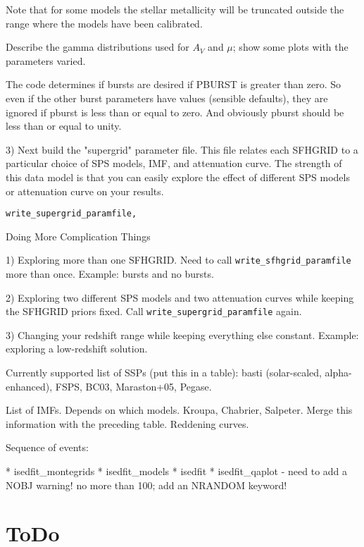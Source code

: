 \documentclass[12pt,preprint]{aastex}
\newcommand{\sfhpro}{{\tt write\_sfhgrid\_paramfile}}
\newcommand{\superpro}{{\tt write\_supergrid\_paramfile}}
\begin{document}
Note that for some models the stellar metallicity will be truncated
outside the range where the models have been calibrated.

Describe the gamma distributions used for $A_V$ and $\mu$; show some
plots with the parameters varied.

The code determines if bursts are desired if PBURST is greater than
zero.  So even if the other burst parameters have values (sensible
defaults), they are ignored if pburst is less than or equal to zero.
And obviously pburst should be less than or equal to unity.
  

3) Next build the "supergrid" parameter file.  This file relates each
SFHGRID to a particular choice of SPS models, IMF, and attenuation
curve.  The strength of this data model is that you can easily explore
the effect of different SPS models or attenuation curve on your
results.

\begin{verbatim}
write_supergrid_paramfile, 
\end{verbatim}


%   
%   


Doing More Complication Things

1) Exploring more than one SFHGRID.  Need to call \sfhpro{} more than
once.  Example: bursts and no bursts.

2) Exploring two different SPS models and two attenuation curves while
keeping the SFHGRID priors fixed.  Call \superpro{} again.

3) Changing your redshift range while keeping everything else
constant.  Example: exploring a low-redshift solution.

Currently supported list of SSPs (put this in a table): basti
(solar-scaled, alpha-enhanced), FSPS, BC03, Maraston+05, Pegase. 

List of IMFs.  Depends on which models.  Kroupa, Chabrier,
Salpeter. Merge this information with the preceding table.   Reddening
curves.  



Sequence of events:

* isedfit_montegrids
* isedfit_models
* isedfit
* isedfit_qaplot - need to add a NOBJ warning!  no more than 100; add
  an NRANDOM keyword!


\section{ToDo}

\begin{itemize}
\item{Add more forbidden (e.g., nebular, auroral emission lines). 
\end{itemize}
\end{document}
